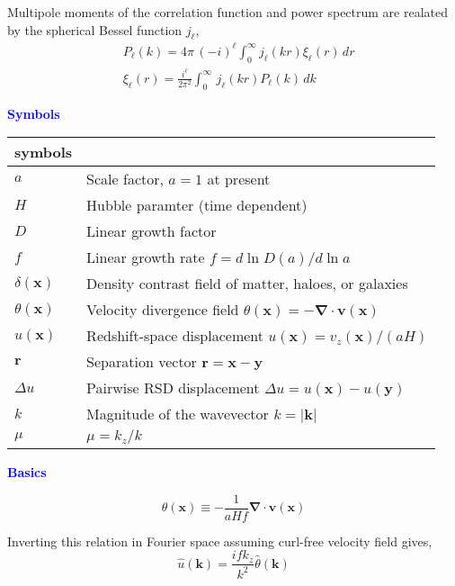 \documentclass[a4paper,11pt, fleqn]{article}
\begin{document}
Multipole moments of the correlation function and power spectrum are realated by the spherical Bessel function $j_\ell$,
\begin{align}
  &P_\ell(k) = 4\pi \, (-i)^\ell \!\int_0^\infty j_\ell(kr) \xi_\ell(r) \,dr\\
  &\xi_\ell(r) = \frac{i^\ell}{2\pi^2} \int_0^\infty \,j_\ell(kr) P_\ell(k) \,dk
\end{align}




%
%
\newpage
{\Huge \textbf{\textcolor{Blue}{Symbols}}}

\begin{center}
  \begin{tabular}{ll}
    symbols & \\
    \hline
    $a$ & Scale factor, $a=1$ at present\\
    $H$ & Hubble paramter (time dependent)\\
    $D$ & Linear growth factor\\
    $f$ & Linear growth rate $f = d \ln D(a)/d\ln a$\\
    $\delta(\bm{x})$ & Density contrast field of matter, haloes, or galaxies\\
    
    $\theta(\bm{x})$ & Velocity divergence field
    $\theta(\bm{x}) = -\bm{\nabla} \cdot \bm{v}(\bm{x})$\\
    $u(\bm{x})$ & Redshift-space displacement $u(\bm{x}) = v_z(\bm{x})/(aH)$\\
    $\bm{r}$ & Separation vector $\bm{r} = \bm{x} - \bm{y}$\\
    $\Delta u$ & Pairwise RSD displacement $\Delta u = u(\bm{x}) - u(\bm{y})$\\
    $k$ & Magnitude of the wavevector $k = |\bm{k}|$\\
    $\mu$ & $\mu=k_z/k$\\
    \hline
  \end{tabular}
\end{center}

%
%
%
\newpage

{\Huge \textbf{\textcolor{Blue}{Basics}}}

\begin{equation}
  \theta(\bm{x}) \equiv - \frac{1}{aHf} \bm{\nabla}\cdot\bm{v}(\bm{x})
\end{equation}

Inverting this relation in Fourier space assuming curl-free velocity
field gives,
\begin{equation}
  \hat{u}(\bm{k}) = \frac{ifk_z}{k^2} \hat{\theta}(\bm{k})
\end{equation}
\end{document}
